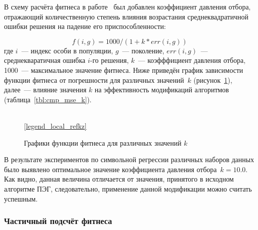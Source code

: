 В схему расчёта фитнеса в работе~\cite{Lopes:2004:AMCS} был добавлен коэффициент давления отбора, отражающий количественную степень влияния возрастания среднеквадратичной ошибки решения на падение его приспособленности:

\begin{equation}
\label{eq:EGIPSYS_fitness}
f(i, g) = 1000 / (1 + k * err(i, g))
\end{equation}
где $i$~--- индекс особи в популяции, $g$~--- поколение, $err(i, g)$~--- среднекваратичная ошибка $i$-го решения, $k$~--- коэфффициент давления отбора, 1000~--- максимальное значение фитнеса. Ниже приведён график зависимости функции фитнеса от погрешности для различных значений~$k$ (рисунок~\ref{img:kz}), далее~--- влияние значения $k$ на эффективность модификаций алгоритмов (таблица~\ref{tbl:cmp_mse_k}).

\begin{figure} [h]
  \center
  \\
  \ref{legend_local_refkz}
  \caption{Графики функции фитнеса для различных значений $k$}
  \label{img:kz}
\end{figure}



В результате экспериментов по символьной регрессии различных наборов данных было выявлено оптимальное значение коэффициента давления отбора~$k=10.0$. Как видно, данная величина отличается от значения, принятого в исходном алгоритме ПЭГ, следовательно, применение данной модификации можно считать успешным.


\subsubsection{Частичный подсчёт фитнеса}

